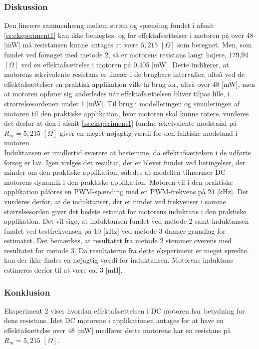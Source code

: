 \subsubsection{Diskussion}
Den lineære sammenhæng mellem strøm og spænding fundet i afsnit \ref{ss:eksperiment1} kan ikke benægtes,
og for effektafsættelser i motoren på over 48 [mW] må resistansen kunne antages at være \(5,215\) \([\Omega]\)  som beregnet.
Men, som fundet ved forsøget med metode 2, så er motorens resistans langt højere,
179,94 \([\Omega]\) ved en effektafsættelse i motoren på 0,405 [mW].
Dette indikerer, at motorens ækvivalente resistans er lineær i de brugbare intervaller, altså ved de effektafsættelser en
praktisk applikation ville få brug for, altså over 48 [mW], men at motoren opfører sig anderledes når effektafsættelsen
bliver tilpas lille, i strørrelsesordenen under 1 [mW].
Til brug i modelleringen og simuleringen af motoren til den praktiske applikation, hvor motoren skal kunne rotere,
vurderes det derfor at den i afsnit \ref{ss:eksperiment1} fundne ækvivalente modstand på \(R_m=5,215\) \([\Omega]\) giver en meget nøjagtig værdi for den faktiske modstand i motoren.\\

Induktansen er imidlertid sværere at bestemme, da effektafsættelsen i de udførte forsøg er lav.
Igen vælges det resultat, der er blevet fundet ved betingelser, der minder om den praktiske applikation,
således at modellen tilnærmer DC-motorens dynamik i den praktiske applikation.
Motoren vil i den praktiske applikation påføres en PWM-spænding med en PWM-frekvens
på 24 [kHz]. Det vurderes derfor, at de induktanser, der er fundet ved frekvenser i samme størrelsesorden
giver det bedste estimat for motorens induktans i den praktiske applikation.
Det vil sige, at induktansen fundet ved metode 2 samt induktansen fundet ved testfrekvensen på 10 [kHz]
ved metode 3 danner grundlag for estimatet. Det bemærkes, at resultatet fra metode 2 stemmer overens med
resultatet for metode 3.
Da resultaterne fra dette eksperiment er meget spredte, kan der ikke findes en nøjagtig værdi for induktansen.
Motorens induktans estimeres derfor til at være ca. 3 [mH].

\subsubsection{Konklusion}
Eksperiment 2 viser hvordan effektafsættelsen i DC motoren har betydning for dens resistans. Idet DC motorene i applikationen antages for at have en effektafsættelse over 48 [mW] medfører dette motorens har en resistans på \(R_m=5,215\) \([\Omega]\).\\

